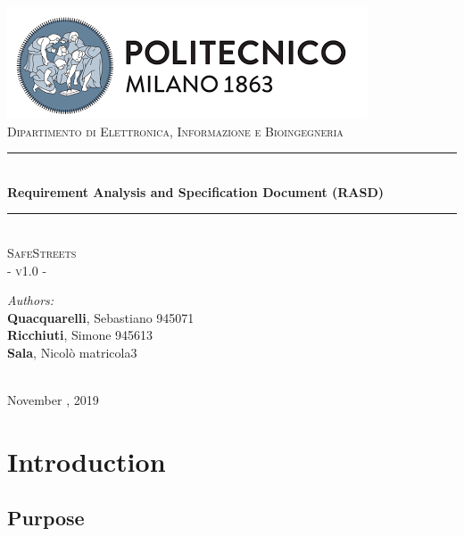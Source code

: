 \documentclass{article}
\begin{document}
	\begin{titlepage}
		
		\centering
		\vspace*{0.7 cm}
		\includegraphics[scale = 0.7]{images/PolimiLogo.png}\\[1 cm]
		\textsc{\large Dipartimento di Elettronica, Informazione e Bioingegneria}\\[2 cm]
		
		\rule{\linewidth}{0.2 mm} \\[0.5 cm]
		{\huge \bfseries Requirement Analysis and Specification Document (RASD)}\\
		\rule{\linewidth}{0.2 mm} \\[1.5 cm]
		
		\textsc{\Large SafeStreets}\\[0.5 cm]
		\textsc{\large - v1.0 -}\\[1 cm]
		
		\begin{minipage}{\textwidth}
			\begin{flushleft} \large
				\emph{Authors:}\\
				\textbf{Quacquarelli}, Sebastiano \hfill 945071 \\
				\textbf{Ricchiuti}, Simone \hfill 945613  \\
				\textbf{Sala}, Nicolò \hfill matricola3 \\[2 cm]
			\end{flushleft}
		\end{minipage}\\[2 cm]
		
		{\large November  , 2019}\\[2 cm]
		
	\end{titlepage}
	
	\tableofcontents
	
	\newpage
	\setcounter{page}{1}
	
	\section{Introduction}
	\subsection{Purpose}
	
\end{document}
